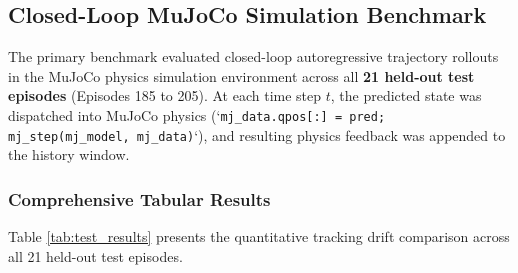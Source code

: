 \documentclass[11pt,a4paper]{article}
\begin{document}
\subsection{Closed-Loop MuJoCo Simulation Benchmark}
The primary benchmark evaluated closed-loop autoregressive trajectory rollouts in the MuJoCo physics simulation environment \cite{tassa2012synthesis} across all \textbf{21 held-out test episodes} (Episodes 185 to 205). At each time step $t$, the predicted state was dispatched into MuJoCo physics (`\texttt{mj\_data.qpos[:] = pred; mj\_step(mj\_model, mj\_data)}`), and resulting physics feedback was appended to the history window.

\subsubsection{Comprehensive Tabular Results}
Table \ref{tab:test_results} presents the quantitative tracking drift comparison across all 21 held-out test episodes.
\end{document}

